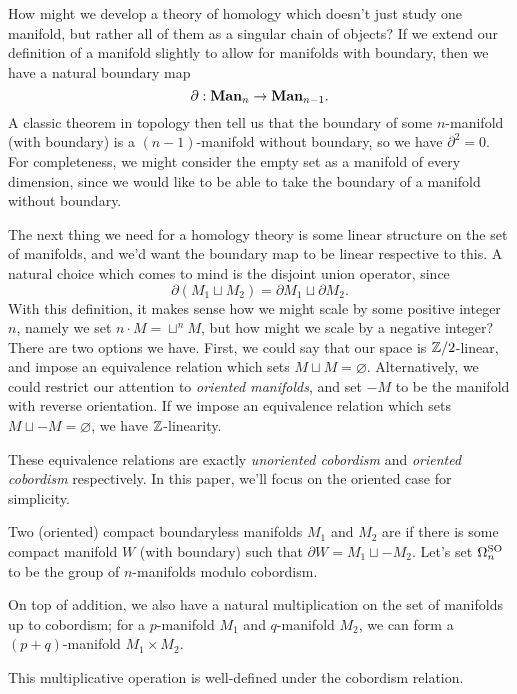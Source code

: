 \documentclass{article}
\begin{document}
How might we develop a theory of homology which doesn't just study one manifold, but rather all of them as a singular chain of objects? If we extend our definition of a manifold slightly to allow for manifolds with boundary, then we have a natural boundary map
\[
    \partial : \mathbf{Man}_n \to \mathbf{Man}_{n-1}.
\]
A classic theorem in topology then tell us that the boundary of some $n$-manifold (with boundary) is a $(n-1)$-manifold without boundary, so we have $\partial^2=0$. For completeness, we might consider the empty set as a manifold of every dimension, since we would like to be able to take the boundary of a manifold without boundary.

The next thing we need for a homology theory is some linear structure on the set of manifolds, and we'd want the boundary map to be linear respective to this. A natural choice which comes to mind is the disjoint union operator, since 
\[
    \partial(M_1\sqcup M_2) = \partial M_1 \sqcup \partial M_2.
\]
With this definition, it makes sense how we might scale by some positive integer $n$, namely we set $n\cdot M = \sqcup^n M$, but how might we scale by a negative integer? There are two options we have. First, we could say that our space is $\mathbb{Z}/2$-linear, and impose an equivalence relation which sets $M\sqcup M = \varnothing$. Alternatively, we could restrict our attention to \emph{oriented manifolds}, and set $-M$ to be the manifold with reverse orientation. If we impose an equivalence relation which sets $M\sqcup -M=\varnothing$, we have $\mathbb{Z}$-linearity. 

These equivalence relations are exactly \emph{unoriented cobordism} and \emph{oriented cobordism} respectively. In this paper, we'll focus on the oriented case for simplicity.

\begin{definition}
  Two (oriented) compact boundaryless manifolds $M_1$ and $M_2$ are  if there is some compact manifold $W$ (with boundary) such that $\partial W = M_1\sqcup -M_2$. Let's set $\Omega^{\mathrm{SO}}_n$ to be the group of $n$-manifolds modulo cobordism.
\end{definition}

On top of addition, we also have a natural multiplication on the set of manifolds up to cobordism; for a $p$-manifold $M_1$ and $q$-manifold $M_2$, we can form a $(p+q)$-manifold $M_1\times M_2$.

\begin{proposition}
  This multiplicative operation is well-defined under the cobordism relation.
\end{proposition}
\end{document}
